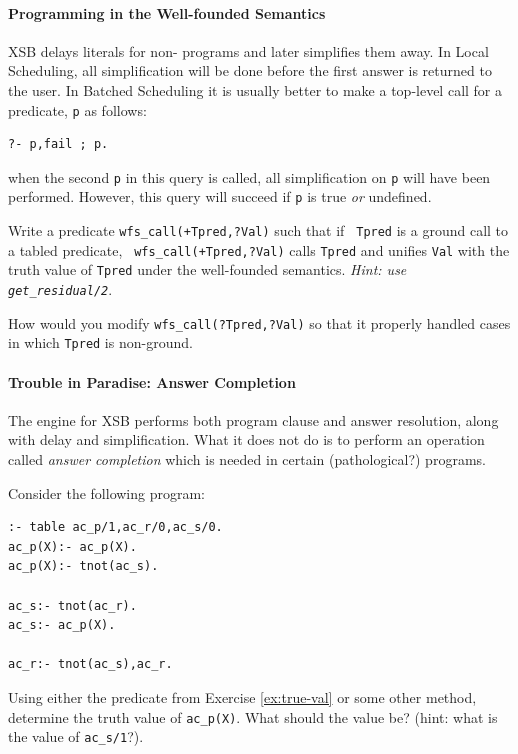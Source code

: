 \paragraph{Programming in the Well-founded Semantics}

XSB delays literals for non-\LRD{} programs and later simplifies them
away.  In Local Scheduling, all simplification will be done before the
first answer is returned to the user.  In Batched Scheduling it is
usually better to make a top-level call for a predicate, {\tt p} as
follows:
\begin{verbatim}
?- p,fail ; p.
\end{verbatim}
when the second {\tt p} in this query is called, all simplification on
{\tt p} will have been performed.  However, this query will succeed if
{\tt p} is true {\em or} undefined.

\begin{exercise} \label{ex:true-val}
Write a predicate {\tt wfs\_call(+Tpred,?Val)} such that if {\tt
Tpred} is a ground call to a tabled predicate, {\tt
wfs\_call(+Tpred,?Val)} calls {\tt Tpred} and unifies {\tt Val} with
the truth value of {\tt Tpred} under the well-founded semantics.
{\em Hint: use {\tt get\_residual/2}}.

How would you modify {\tt wfs\_call(?Tpred,?Val)} so that it properly
handled cases in which {\tt Tpred} is non-ground.
\end{exercise}

\paragraph*{Trouble in Paradise: Answer Completion}

The engine for XSB performs both program clause and answer resolution,
along with delay and simplification.  What it does not do is to
perform an operation called {\em answer completion} which is needed in
certain (pathological?) programs.

\begin{exercise}
Consider the following program:
\begin{verbatim}
:- table ac_p/1,ac_r/0,ac_s/0.
ac_p(X):- ac_p(X).
ac_p(X):- tnot(ac_s).

ac_s:- tnot(ac_r).
ac_s:- ac_p(X).

ac_r:- tnot(ac_s),ac_r.
\end{verbatim}
Using either the predicate from Exercise \ref{ex:true-val} or some
other method, determine the truth value of {\tt ac\_p(X)}.  What
should the value be?  (hint: what is the value of {\tt ac\_s/1}?).
\end{exercise}

